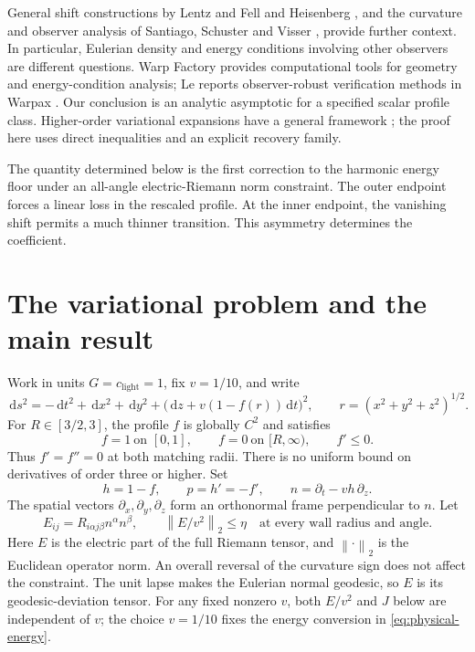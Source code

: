 \documentclass[11pt,a4paper]{article}
\newcommand{\dd}{\,\mathrm d}
\newcommand{\opnorm}[1]{\left\lVert #1\right\rVert_2}
\numberwithin{equation}{section}
\begin{document}
General shift constructions by Lentz \cite{lentz} and Fell and Heisenberg
\cite{fellheisenberg}, and the curvature and observer analysis of Santiago,
Schuster and Visser \cite{santiago}, provide further context. In particular,
Eulerian density and energy conditions involving other observers are
different questions. Warp Factory \cite{warpfactory} provides computational
tools for geometry and energy-condition analysis; Le reports
observer-robust verification methods in Warpax \cite{warpax}. Our conclusion is an analytic asymptotic for a
specified scalar profile class. Higher-order variational expansions have
a general framework \cite{braides}; the proof here uses direct inequalities
and an explicit recovery family.

The quantity determined below is the first correction to the harmonic
energy floor under an all-angle electric-Riemann norm constraint.
The outer endpoint forces a linear loss in the rescaled profile.
At the inner endpoint, the vanishing shift permits a much thinner
transition. This asymmetry determines the coefficient.

\section{The variational problem and the main result}\label{sec:problem}

Work in units \(G=c_{\mathrm{light}}=1\), fix \(v=1/10\), and write
\begin{equation}\label{eq:metric}
 \dd s^2=-\dd t^2+\dd x^2+\dd y^2+
 \bigl(\dd z+v(1-f(r))\dd t\bigr)^2,\qquad
 r=(x^2+y^2+z^2)^{1/2}.
\end{equation}
For \(R\in[3/2,3]\), the profile \(f\) is globally \(C^2\) and satisfies
\[
 f=1\ \text{on }[0,1],\qquad f=0\ \text{on }[R,\infty),
 \qquad f'\le0.
\]
Thus \(f'=f''=0\) at both matching radii. There is no uniform bound on
derivatives of order three or higher. Set
\[
 h=1-f,\qquad p=h'=-f',\qquad
 n=\partial_t-vh\,\partial_z.
\]
The spatial vectors \(\partial_x,\partial_y,\partial_z\) form an
orthonormal frame perpendicular to \(n\). Let
\begin{equation}\label{eq:Edef}
 E_{ij}=R_{i\alpha j\beta}n^\alpha n^\beta,\qquad
 \opnorm{E/v^2}\le\eta \quad\text{at every wall radius and angle}.
\end{equation}
Here \(E\) is the electric part of the full Riemann tensor, and
\(\opnorm{\cdot}\) is the Euclidean operator norm. An overall reversal of
the curvature sign does not affect the constraint. The unit lapse makes
the Eulerian normal geodesic, so \(E\) is its geodesic-deviation tensor.
For any fixed nonzero \(v\), both \(E/v^2\) and \(J\) below are independent
of \(v\); the choice \(v=1/10\) fixes the energy conversion
in \eqref{eq:physical-energy}.
\end{document}
